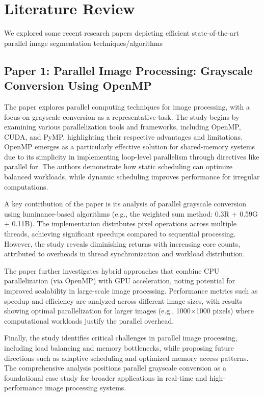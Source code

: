 \documentclass[conference]{IEEEtran}
\begin{document}
\section{Literature Review}
We explored some recent research papers depicting efficient state-of-the-art parallel image segmentation techniques/algorithms
\subsection{Paper 1: Parallel Image Processing: Grayscale Conversion Using OpenMP}

The paper explores parallel computing techniques for image processing, with a focus on grayscale conversion as a representative task. The study begins by examining various parallelization tools and frameworks, including OpenMP, CUDA, and PyMP, highlighting their respective advantages and limitations. OpenMP emerges as a particularly effective solution for shared-memory systems due to its simplicity in implementing loop-level parallelism through directives like parallel for. The authors demonstrate how static scheduling can optimize balanced workloads, while dynamic scheduling improves performance for irregular computations.

A key contribution of the paper is its analysis of parallel grayscale conversion using luminance-based algorithms (e.g., the weighted sum method: 0.3R + 0.59G + 0.11B). The implementation distributes pixel operations across multiple threads, achieving significant speedups compared to sequential processing. However, the study reveals diminishing returns with increasing core counts, attributed to overheads in thread synchronization and workload distribution.

The paper further investigates hybrid approaches that combine CPU parallelization (via OpenMP) with GPU acceleration, noting potential for improved scalability in large-scale image processing. Performance metrics such as speedup and efficiency are analyzed across different image sizes, with results showing optimal parallelization for larger images (e.g., 1000×1000 pixels) where computational workloads justify the parallel overhead.

Finally, the study identifies critical challenges in parallel image processing, including load balancing and memory bottlenecks, while proposing future directions such as adaptive scheduling and optimized memory access patterns. The comprehensive analysis positions parallel grayscale conversion as a foundational case study for broader applications in real-time and high-performance image processing systems.
\end{document}
